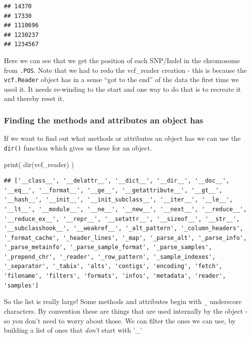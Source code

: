 \documentclass[]{book}
\newenvironment{Shaded}{\begin{snugshade}}{\end{snugshade}}
\newcommand{\BuiltInTok}[1]{#1}
\newcommand{\NormalTok}[1]{#1}
\theoremstyle{definition}
\theoremstyle{definition}
\theoremstyle{definition}
\theoremstyle{remark}
\begin{document}
\begin{verbatim}
## 14370
## 17330
## 1110696
## 1230237
## 1234567
\end{verbatim}

Here we can see that we get the position of each SNP/Indel in the
chromosome from \texttt{.POS}. Note that we had to redo the vcf\_reader
creation - this is because the \texttt{vcf.Reader} object has in a sense
``got to the end'' of the data the first time we used it. It needs
re-winding to the start and one way to do that is to recreate it and
thereby reset it.

\hypertarget{finding-the-methods-and-attributes-an-object-has}{%
\subsubsection{Finding the methods and attributes an object
has}\label{finding-the-methods-and-attributes-an-object-has}}

If we want to find out what methods or attributes an object has we can
use the \texttt{dir()} function which gives us these for an object.

\begin{Shaded}
\begin{Highlighting}[]
\BuiltInTok{print}\NormalTok{( }\BuiltInTok{dir}\NormalTok{(vcf_reader) )}
\end{Highlighting}
\end{Shaded}

\begin{verbatim}
## ['__class__', '__delattr__', '__dict__', '__dir__', '__doc__', '__eq__', '__format__', '__ge__', '__getattribute__', '__gt__', '__hash__', '__init__', '__init_subclass__', '__iter__', '__le__', '__lt__', '__module__', '__ne__', '__new__', '__next__', '__reduce__', '__reduce_ex__', '__repr__', '__setattr__', '__sizeof__', '__str__', '__subclasshook__', '__weakref__', '_alt_pattern', '_column_headers', '_format_cache', '_header_lines', '_map', '_parse_alt', '_parse_info', '_parse_metainfo', '_parse_sample_format', '_parse_samples', '_prepend_chr', '_reader', '_row_pattern', '_sample_indexes', '_separator', '_tabix', 'alts', 'contigs', 'encoding', 'fetch', 'filename', 'filters', 'formats', 'infos', 'metadata', 'reader', 'samples']
\end{verbatim}

So the list is really large! Some methods and attributes begin with
\texttt{\_} underscore characters. By convention these are things that
are used internally by the object - so you don't need to worry about
those. We can filter the ones we can use, by building a list of ones
that \emph{don't} start with '\_'
\end{document}
